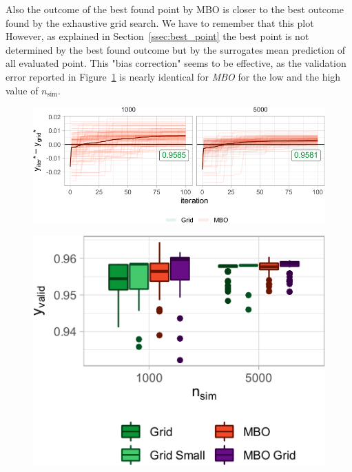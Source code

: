 \documentclass[bimj,fleqn]{w-art}
\theoremstyle{plain}
\theoremstyle{definition}
\begin{document}
Also the outcome of the best found point by MBO is closer to the best outcome found by the exhaustive grid search.
We have to remember that this plot 
However, as explained in Section~\ref{ssec:best_point} the best point is not determined by the best found outcome but by the surrogates mean prediction of all evaluated point.
This "bias correction" seems to be effective, as the validation error reported in Figure~\ref{fig:plot_boxplot_valid_y_5000} is nearly identical for \emph{MBO} for the low and the high value of $n_\text{sim}$.
\begin{figure}[htb]
\centering
  \begin{minipage}{0.62\textwidth}
    \centering
    \includegraphics[width=\linewidth]{generated/figures/plot_opt_path_5000.pdf}%
    \label{fig:plot_opt_path_5000}
  \end{minipage}\hspace{0.02\textwidth}%
  \begin{minipage}{0.35\textwidth}
    \centering
    \includegraphics[width=\linewidth]{generated/figures/plot_boxplot_valid_y_5000.pdf}%
    \label{fig:plot_boxplot_valid_y_5000}
  \end{minipage}
\end{figure}
\end{document}
